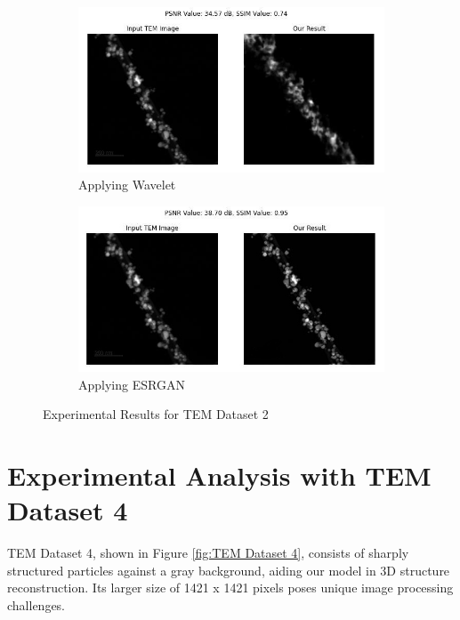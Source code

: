 \begin{figure}[H]
    \begin{subfigure}{.47\textwidth} %
        \includegraphics[width=\textwidth]{img/Results/Dataset_2/Dataset_2_wavelet.jpg}
        \caption{Applying Wavelet}
        \label{fig:Image5}
    \end{subfigure}
    \hfill
    \begin{subfigure}{.47\textwidth} %
        \includegraphics[width=\textwidth]{img/Results/Dataset_2/Dataset_2_ESRGAN.jpg}
        \caption{Applying ESRGAN}
        \label{fig:TEM_Dataset_2_Image5}
    \end{subfigure}
    \caption{Experimental Results for TEM Dataset 2}
    \label{fig:TEM_Dataset_2_Results}
\end{figure}


\clearpage
\section{Experimental Analysis with TEM Dataset 4}
TEM Dataset 4, shown in Figure \ref{fig:TEM Dataset 4}, consists of sharply structured particles against a gray background, aiding our model in 3D structure reconstruction. Its larger size of 1421 x 1421 pixels poses unique image processing challenges.
\vspace{10pt}

